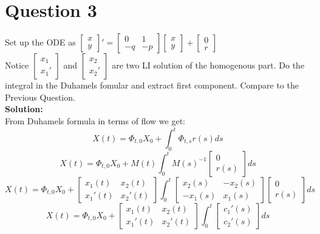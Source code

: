 \documentclass{article}
\begin{document}
\section{Question 3}
Set up the ODE as $\begin{bmatrix}
    x \\
    y
\end{bmatrix}' = \begin{bmatrix}
    0 & 1\\
    -q & -p
\end{bmatrix} \begin{bmatrix}
    x\\
    y
\end{bmatrix} + \begin{bmatrix}
    0\\
    r
\end{bmatrix}$\\
Notice $\begin{bmatrix}
    x_1\\
    x_1'
\end{bmatrix}$ and $\begin{bmatrix}
    x_2\\
    x_2'
\end{bmatrix}$ are two LI solution of the homogenous part. Do the integral in the Duhamels fomular and extract first component. Compare to the Previous Question.\\
\textbf{Solution:}\\
From Duhamels formula in terms of flow we get:\\
$$X(t) = \Phi_{t,0}X_0 + \int_0^t \Phi_{t,s}r(s)ds$$
$$X(t) = \Phi_{t,0}X_0 + M(t)\int_0^t M(s)^{-1}\begin{bmatrix}
    0\\
    r(s)
\end{bmatrix}ds $$
$$X(t) = \Phi_{t,0}X_0 + \begin{bmatrix}
    x_1(t) & x_2(t)\\
    x_1'(t) & x_2'(t)
\end{bmatrix} \int_0^t \begin{bmatrix}
    x_2(s) & -x_2(s)\\
    -x_1(s) & x_1(s)
\end{bmatrix} \begin{bmatrix}
    0\\
    r(s)
\end{bmatrix}ds$$
$$X(t) = \Phi_{t,0}X_0 + \begin{bmatrix}
    x_1(t) & x_2(t)\\
    x_1'(t) & x_2'(t)
\end{bmatrix} \int_0^t \begin{bmatrix}
    c_1'(s)\\
    c_2'(s)
\end{bmatrix}ds$$
\end{document}
